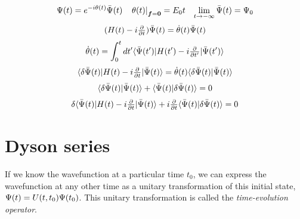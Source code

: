 \documentclass[11pt]{article}
\numberwithin{equation}{section}
\begin{document}
\begin{dfn}
\begin{align}
  \Y(t)
=
  e^{-i\th(t)}
  \bar{\Y}(t)
&&
  \left.
  \th(t)
  \right|_{\bm{f}=\bo{0}}
=
  E_0
  t
&&
  \lim_{t\rightarrow-\infty}
  \bar{\Y}(t)
=
  \Y_0
\end{align}
\begin{align}
  (
    H(t)
  -
    i
    \tfrac{\partial}{\partial t}
  )
  \bar{\Psi }(t)
=
  \dot{\theta }(t)
  \bar{\Psi }(t)
\end{align}
\begin{align}
  \dot{\theta }(t)
=
  \int_0^t
  dt'
  \langle\bar{\Psi }(t')|
    H(t')
  -
    i\tfrac{\partial}{\partial t'}
  |\bar{\Psi }(t')\rangle
\end{align}
\begin{align}
  \langle\delta \bar{\Psi }(t)|
    H(t)
  -
    i
    \tfrac{\partial}{\partial t}
  |\bar{\Psi }(t)\rangle
=
  \dot{\theta }(t)
  \langle\delta \bar{\Psi }(t)|\bar{\Psi }(t)\rangle
\end{align}
\begin{align}
  \langle\delta \bar{\Psi }(t)|\bar{\Psi }(t)\rangle
+
  \langle\bar{\Psi }(t)|\delta \bar{\Psi }(t)\rangle
=
  0
\end{align}
\begin{align}
  \delta 
  \langle\bar{\Psi }(t)|
    H(t)
  -
    i
    \tfrac{\partial}{\partial t}
  |\bar{\Psi }(t)\rangle
+
  i
  \tfrac{\partial}{\partial t}
  \langle\bar{\Psi }(t)|\delta \bar{\Psi }(t)\rangle
=
  0
\end{align}
\end{dfn}


\newpage
\appendix

\section{Dyson series}
\label{appendix:dyson-series}

\begin{dfn}
If we know the wavefunction at a particular time $t_0$, we can express the wavefunction at any other time as a unitary transformation of this initial state, $\Psi (t)=U(t,t_0)\Psi (t_0)$.
This unitary transformation is called the \textit{time-evolution operator}.
\end{dfn}
\end{document}
